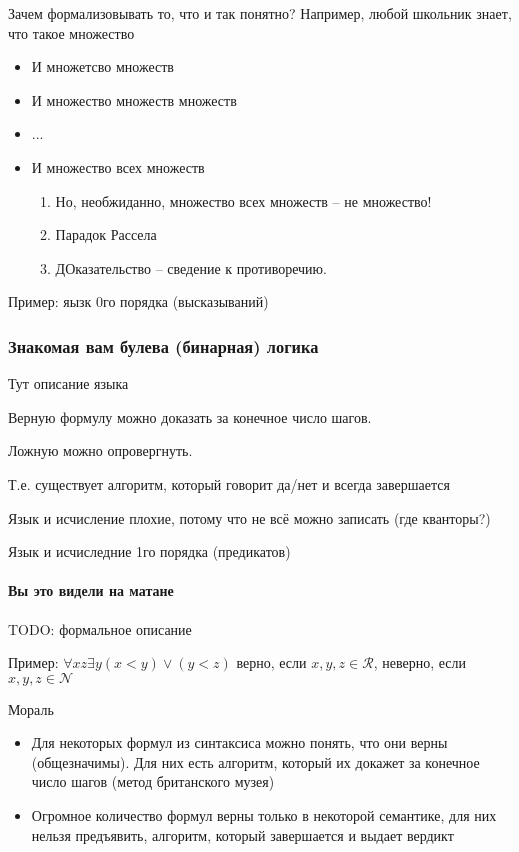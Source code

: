 \begin{frame}{Зачем формализовывать то, что и так понятно?}
  Например, любой школьник знает, что такое множество
  \begin{itemize}
    \item И множетсво множеств
    \item И множество множеств множеств
    \item ...
    \item И множество всех множеств
    \begin{enumerate}
\item       Но, необжиданно, множество всех множеств -- не множество!
      \item Парадок Рассела
      \item ДОказательство -- сведение к противоречию.
    \end{enumerate}
  \end{itemize}
\end{frame}

\begin{frame}{Пример: яызк 0го порядка (высказываний) }
\frametitle{Знакомая вам булева (бинарная) логика}

Тут описание языка

\begin{theorem}
  Верную формулу можно доказать за конечное число шагов.

   Ложную можно опровергнуть.

   Т.е. существует алгоритм, который говорит да/нет и всегда завершается
\end{theorem}

Язык и исчисление плохие, потому что не всё можно записать (где кванторы?)

\end{frame}


\begin{frame}{Язык и исчиследние 1го порядка (предикатов)}
\framesubtitle{Вы это видели на матане}

TODO: формальное описание

Пример: $\forall x z \exists y (x < y) \vee (y < z)$
верно, если $x,y,z \in \mathcal{R}$, неверно, если $x,y,z \in \mathcal{N}$

Мораль
\begin{itemize}
  \item Для некоторых формул из синтаксиса можно понять, что они верны (общезначимы). Для них есть алгоритм, который их докажет за конечное число шагов (метод британского музея)
  \item Огромное количество формул верны только в некоторой семантике, для них нельзя предъявить, алгоритм, который завершается и выдает вердикт
\end{itemize}
\begin{definition}
\end{definition}
\begin{definition}
\end{definition}
\end{frame}


